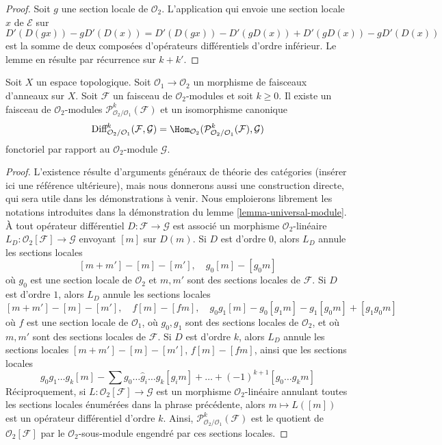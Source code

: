 \begin{proof}
Soit $g$ une section locale de $\mathcal{O}_2$. L'application qui envoie une
section locale $x$ de $\mathcal{E}$ sur
$$
D'(D(gx)) - gD'(D(x)) = D'(D(gx)) - D'(gD(x)) + D'(gD(x)) - gD'(D(x))
$$
est la somme de deux composées d'opérateurs différentiels d'ordre inférieur.
Le lemme en résulte par récurrence sur $k + k'$.
\end{proof}

\begin{lemma}
\label{lemma-module-principal-parts}
Soit $X$ un espace topologique. Soit
$\mathcal{O}_1 \to \mathcal{O}_2$ un morphisme de faisceaux d'anneaux sur
$X$. Soit $\mathcal{F}$ un faisceau de $\mathcal{O}_2$-modules et soit
$k \geq 0$. Il existe un faisceau de $\mathcal{O}_2$-modules
$\mathcal{P}^k_{\mathcal{O}_2/\mathcal{O}_1}(\mathcal{F})$
et un isomorphisme canonique
$$
\text{Diff}^k_{\mathcal{O}_2/\mathcal{O}_1}(\mathcal{F}, \mathcal{G}) =
\Hom_{\mathcal{O}_2}(
\mathcal{P}^k_{\mathcal{O}_2/\mathcal{O}_1}(\mathcal{F}), \mathcal{G})
$$
fonctoriel par rapport au $\mathcal{O}_2$-module $\mathcal{G}$.
\end{lemma}

\begin{proof}
L'existence résulte d'arguments généraux de théorie des catégories
(insérer ici une référence ultérieure), mais nous donnerons aussi une
construction directe, qui sera utile dans les démonstrations à venir. Nous
emploierons librement les notations introduites dans la démonstration du
lemme \ref{lemma-universal-module}. À tout opérateur différentiel
$D : \mathcal{F} \to \mathcal{G}$ est associé un morphisme
$\mathcal{O}_2$-linéaire
$L_D : \mathcal{O}_2[\mathcal{F}] \to \mathcal{G}$
envoyant $[m]$ sur $D(m)$. Si $D$ est d'ordre $0$, alors $L_D$ annule les
sections locales
$$
[m + m'] - [m] - [m'],\quad
g_0[m] - [g_0m]
$$
où $g_0$ est une section locale de $\mathcal{O}_2$ et $m, m'$ sont des
sections locales de $\mathcal{F}$. Si $D$ est d'ordre $1$, alors $L_D$
annule les sections locales
$$
[m + m'] - [m] - [m'],\quad
f[m] - [fm], \quad
g_0g_1[m] - g_0[g_1m] - g_1[g_0m] + [g_1g_0m]
$$
où $f$ est une section locale de $\mathcal{O}_1$, où $g_0, g_1$ sont des
sections locales de $\mathcal{O}_2$, et où $m, m'$ sont des sections locales
de $\mathcal{F}$. Si $D$ est d'ordre $k$, alors $L_D$ annule les sections
locales $[m + m'] - [m] - [m']$, $f[m] - [fm]$, ainsi que les sections locales
$$
g_0g_1\ldots g_k[m] - \sum g_0 \ldots \hat g_i \ldots g_k[g_im] + \ldots
+(-1)^{k + 1}[g_0\ldots g_km]
$$
Réciproquement, si $L : \mathcal{O}_2[\mathcal{F}] \to \mathcal{G}$ est un
morphisme $\mathcal{O}_2$-linéaire annulant toutes les sections locales
énumérées dans la phrase précédente, alors $m \mapsto L([m])$ est un
opérateur différentiel d'ordre $k$. Ainsi,
$\mathcal{P}^k_{\mathcal{O}_2/\mathcal{O}_1}(\mathcal{F})$
est le quotient de $\mathcal{O}_2[\mathcal{F}]$ par le
$\mathcal{O}_2$-sous-module engendré par ces sections locales.
\end{proof}

